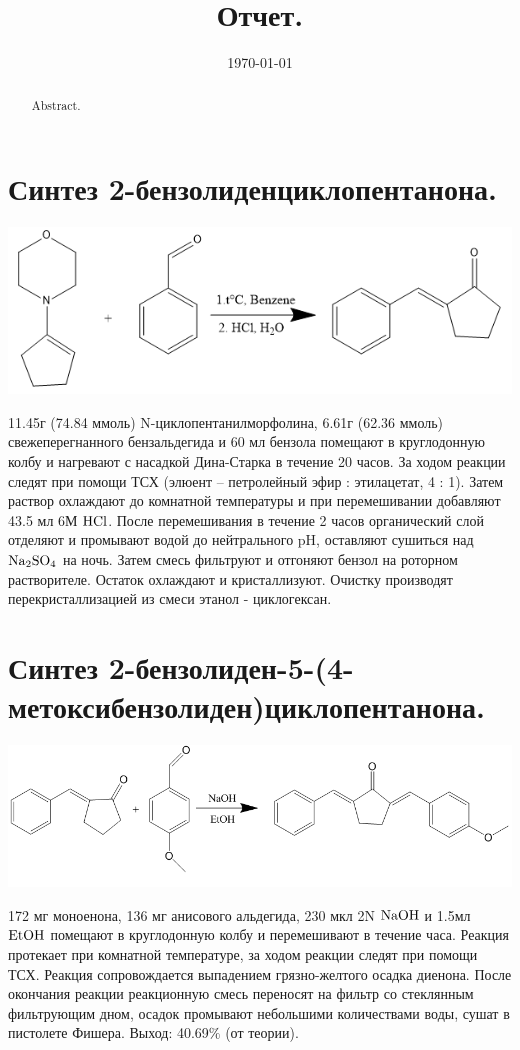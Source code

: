 \documentclass[a4paper]{article}
\title{Отчет.}
\date{\today}
\begin{document}
\maketitle

\begin{abstract}
Abstract.
\end{abstract}

\section*{Синтез 2-бензолиденциклопентанона.}
\begin{center}
\includegraphics[scale=0.5]{pictures/1.png}
\end{center}
11.45г (74.84 ммоль) N-циклопентанилморфолина, 6.61г (62.36 ммоль) свежеперегнанного бензальдегида и 60 мл бензола помещают в круглодонную колбу и нагревают с насадкой Дина-Старка в течение 20 часов. За ходом реакции следят при помощи ТСХ (элюент -- петролейный эфир : этилацетат, 4 : 1).
Затем раствор охлаждают до комнатной температуры и при перемешивании добавляют 43.5 мл 6М $\ce{HCl}$. После перемешивания в течение 2 часов органический слой отделяют и промывают водой до нейтрального pH, оставляют сушиться над $\ce{Na2SO4}$ на ночь. Затем смесь фильтруют и отгоняют бензол на роторном растворителе. Остаток охлаждают и кристаллизуют. Очистку производят перекристаллизацией из смеси этанол - циклогексан.

\section*{Синтез 2-бензолиден-5-(4-метоксибензолиден)циклопентанона.}
\begin{center}
\includegraphics[scale=0.35]{pictures/2.png}
\end{center}
172 мг  моноенона, 136 мг анисового альдегида, 230 мкл 2N $\ce{NaOH}$ и 1.5мл $\ce{EtOH}$ помещают в круглодонную колбу и перемешивают в течение часа. Реакция протекает при комнатной температуре, за ходом реакции следят при помощи ТСХ. Реакция сопровождается выпадением грязно-желтого осадка диенона. После окончания реакции реакционную смесь переносят на фильтр со стеклянным фильтрующим дном, осадок промывают небольшими количествами воды, сушат в пистолете Фишера. 
Выход: 40.69$\%$ (от теории).
\end{document}

